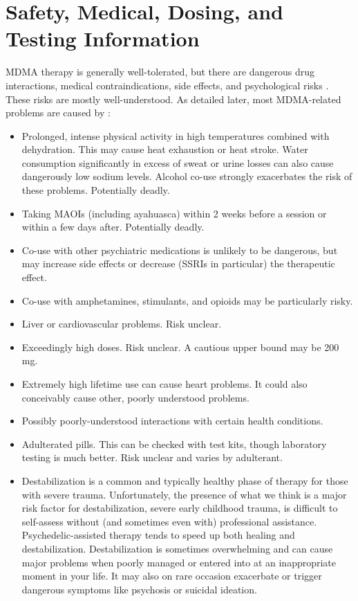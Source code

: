 \documentclass[12pt,letterpaper]{book}
\begin{document}
\section{Safety, Medical, Dosing, and Testing Information}
\label{sec:safety}
MDMA therapy is generally well-tolerated, but there are dangerous drug interactions, medical contraindications, side effects, and psychological risks \cite{wolfgang2025}. These risks are mostly well-understood. As detailed later, most MDMA-related problems are caused by \cite{wolfgang2025,riggDeaths,roxburghDeaths}:
\begin{itemize}
    \item Prolonged, intense physical activity in high temperatures combined with dehydration. This may cause heat exhaustion or heat stroke. Water consumption significantly in excess of sweat or urine losses can also cause dangerously low sodium levels. Alcohol co-use strongly exacerbates the risk of these problems. Potentially deadly.
    \item Taking MAOIs (including ayahuasca) within 2 weeks before a session or within a few days after. Potentially deadly.
    \item Co-use with other psychiatric medications is unlikely to be dangerous, but may increase side effects or decrease (SSRIs in particular) the therapeutic effect.
    \item Co-use with amphetamines, stimulants, and opioids may be particularly risky.
    \item Liver or cardiovascular problems. Risk unclear.
    \item Exceedingly high doses. Risk unclear. A cautious upper bound may be 200 mg.
    \item Extremely high lifetime use can cause heart problems. It could also conceivably cause other, poorly understood problems.
    \item Possibly poorly-understood interactions with certain health conditions.
    \item Adulterated pills. This can be checked with test kits, though laboratory testing is much better. Risk unclear and varies by adulterant.
    \item Destabilization is a common and typically healthy phase of therapy for those with severe trauma. Unfortunately, the presence of what we think is a major risk factor for destabilization, severe early childhood trauma, is difficult to self-assess without (and sometimes even with) professional assistance. Psychedelic-assisted therapy tends to speed up both healing and destabilization. Destabilization is sometimes overwhelming and can cause major problems when poorly managed or entered into at an inappropriate moment in your life. It may also on rare occasion exacerbate or trigger dangerous symptoms like psychosis or suicidal ideation.
\end{itemize}
\end{document}
